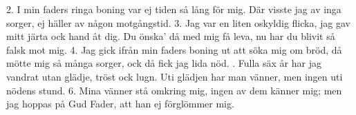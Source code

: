 \setlength{\columnsep}{0cm}
\begin{multicols}{2}
2.  I min faders ringa boning
    var ej tiden så lång för mig.
    Där visste jag av inga sorger,
    ej häller av någon motgångstid.
3.  Jag var en liten oskyldig flicka,
    jag gav mitt järta ock hand åt dig.
    Du önska’ då med mig få leva,
    nu har du blivit så falsk mot mig.
4.  Jag gick ifrån min faders boning
    ut att söka mig om bröd,
    då mötte mig så många sorger,
    ock då fick jag lida nöd.
\vfill{}.  Fulla säx år har jag vandrat
    utan glädje, tröst ock lugn.
    Uti glädjen har man vänner,
    men ingen uti nödens stund.
6.  Mina vänner stå omkring mig,
    ingen av dem känner mig;
    men jag hoppas på Gud Fader,
    att han ej förglömmer mig.
\end{multicols}
